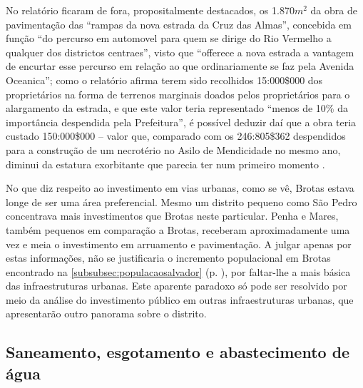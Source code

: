 

No relatório ficaram de fora, propositalmente destacados, os 1.870$m^{2}$ da obra de pavimentação das ``rampas da nova estrada da Cruz das Almas'', concebida em função ``do percurso em automovel para quem se dirige do Rio Vermelho a qualquer dos districtos centraes'', visto que ``offerece a nova estrada a vantagem de encurtar esse percurso em relação ao que ordinariamente se faz pela Avenida Oceanica''; como o relatório afirma terem sido recolhidos 15:000\$000 dos proprietários na forma de terrenos marginais doados pelos proprietários para o alargamento da estrada, e que este valor teria representado ``menos de 10\% da importância despendida pela Prefeitura'', é possível deduzir daí que a obra teria custado 150:000\$000 – valor que, comparado com os 246:805\$362 despendidos para a construção de um necrotério no Asilo de Mendicidade no mesmo ano, diminui da estatura exorbitante que parecia ter num primeiro momento \cite[pp.~22-23]{salvador_relatorio_1929}.

No que diz respeito ao investimento em vias urbanas, como se vê, Brotas estava longe de ser uma área preferencial. Mesmo um distrito pequeno como São Pedro concentrava mais investimentos que Brotas neste particular. Penha e Mares, também pequenos em comparação a Brotas, receberam aproximadamente uma vez e meia o investimento em arruamento e pavimentação. A julgar apenas por estas informações, não se justificaria o incremento populacional em Brotas encontrado na \autoref{subsubsec:populacaosalvador} (p. \pageref{subsubsec:populacaosalvador}), por faltar-lhe a mais básica das infraestruturas urbanas. Este aparente paradoxo só pode ser resolvido por meio da análise do investimento público em outras infraestruturas urbanas, que apresentarão outro panorama sobre o distrito.

\subsection{Saneamento, esgotamento e abastecimento de água}

